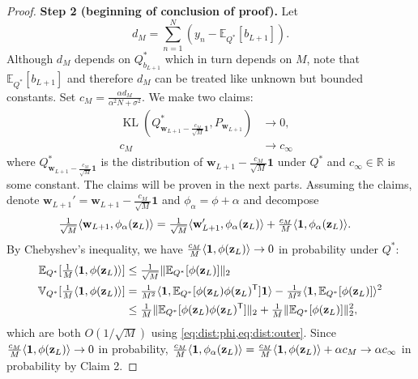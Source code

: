 \documentclass[twoside]{article}
\newcommand{\vw}{\mathbf{w}}
\newcommand{\vz}{\mathbf{z}}
\newcommand{\vone}{\mathbf{1}}
\newcommand{\E}{\mathbb{E}}
\newcommand{\R}{\mathbb{R}}
\newcommand{\V}{\mathbb{V}}
\newcommand{\T}{\text{\textsf{T}}}
\newcommand{\KL}{\operatorname{KL}}
\DeclarePairedDelimiter\lra{\langle}{\rangle}    %
\DeclarePairedDelimiter\norm{\|}{\|}             %
\theoremstyle{theoremstyle}
\begin{document}
\begin{proof}
    \textbf{Step 2 (beginning of conclusion of proof).}
    Let
    \begin{equation}
        d_M = \sum_{n=1}^N (y_n - \E_{Q^*}[b_{L+1}]).
    \end{equation}
    Although $d_M$ depends on $Q^*_{b_{L+1}}$ which in turn depends on $M$, note that $\E_{Q^*}[b_{L+1}]$ and therefore $d_M$ can be treated like unknown but bounded constants.
    Set $c_M = \frac{\alpha d_M}{\alpha^2 N + \sigma^2}$.
    We make two claims:
    \begin{align}
        \KL(Q^*_{\vw_{L+1} - \frac{c_M}{\sqrt{M}} \vone}, P_{\vw_{L+1}}) &\to 0,
         \tag{Claim 1} \quad \\
        c_M &\to c_\infty \tag{Claim 2}
    \end{align}
    where $Q^*_{\vw_{L+1} - \frac{c_M}{\sqrt{M}} \vone}$ is the distribution of $\vw_{L+1} - \frac{c_M}{\sqrt{M}} \vone$ under $Q^*$ and $c_\infty \in \R$ is some constant.
    The claims will be proven in the next parts.
    Assuming the claims, denote $\vw_{L+1}' = \vw_{L+1} - \frac{c_M}{\sqrt{M}}  \vone$ and $\phi_\alpha = \phi + \alpha$ and decompose
    \begin{align}
        \tfrac{1}{\sqrt{M}}\lra{\vw_{L+1}, \phi_\alpha(\vz_L)}
        &= \tfrac{1}{\sqrt{M}}\lra{\vw'_{L+1}, \phi_\alpha(\vz_L)} + \tfrac{c_M}{M} \lra{\vone, \phi_\alpha(\vz_L)}.
    \end{align}
    By Chebyshev's inequality, we have $\tfrac{c_M}{M} \lra{\vone, \phi(\vz_L)} \to 0$ in probability under $Q^*$:
    \begin{align}
        \E_{Q^*}[\tfrac{1}{M} \lra{\vone, \phi(\vz_L)}]
        &\le \tfrac{1}{\sqrt{M}} \norm{\E_{Q^*}[\phi(\vz_L)]}_2 \\
        \V_{Q^*}[\tfrac1M\lra{\vone, \phi(\vz_L)}]
        &= \tfrac1{M^2} \lra{\vone, \E_{Q^*}[\phi(\vz_L)\phi(\vz_L)^\T] \vone}
        - \tfrac{1}{M^2} \lra{\vone, \E_{Q^*}[\phi(\vz_L)]}^2 \\
        &\le \tfrac1M \norm{\E_{Q^*}[\phi(\vz_L)\phi(\vz_L)^\T]}_2 + \tfrac1M \norm{\E_{Q^*}[\phi(\vz_L)]}_2^2,
    \end{align}
    which are both $O(1/\sqrt{M})$ using \cref{eq:dist:phi,eq:dist:outer}.
    Since $\tfrac{c_M}{M} \lra{\vone, \phi(\vz_L)} \to 0$ in probability, $\tfrac{c_M}{M} \lra{\vone, \phi_\alpha(\vz_L)} = \tfrac{c_M}{M} \lra{\vone, \phi(\vz_L)} + \alpha c_M \to \alpha c_\infty$ in probability by Claim 2.
    

\end{proof}
\end{document}
